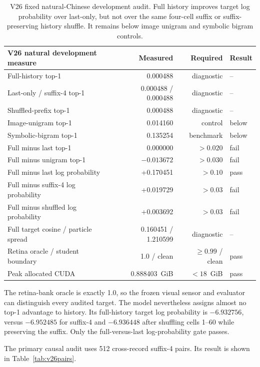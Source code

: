 \documentclass[11pt]{article}
\begin{document}
\begin{table}[t]
\centering
\small
\begin{tabular}{lrrl}
\toprule
V26 natural development measure & Measured & Required & Result \\
\midrule
Full-history top-1 & 0.000488 & diagnostic & -- \\
Last-only / suffix-4 top-1 & 0.000488 / 0.000488 & diagnostic & -- \\
Shuffled-prefix top-1 & 0.000488 & diagnostic & -- \\
Image-unigram top-1 & 0.014160 & control & below \\
Symbolic-bigram top-1 & 0.135254 & benchmark & below \\
Full minus last top-1 & 0.000000 & $>0.020$ & fail \\
Full minus unigram top-1 & $-0.013672$ & $>0.030$ & fail \\
Full minus last log probability & +0.170451 & $>0.10$ & pass \\
Full minus suffix-4 log probability & +0.019729 & $>0.03$ & fail \\
Full minus shuffled log probability & +0.003692 & $>0.03$ & fail \\
Full target cosine / particle spread & 0.160451 / 1.210599 & diagnostic & -- \\
Retina oracle / student boundary & 1.0 / clean & $\geq0.99$ / clean & pass \\
Peak allocated CUDA & 0.888403~GiB & $<18$~GiB & pass \\
\bottomrule
\end{tabular}
\caption{V26 fixed natural-Chinese development audit. Full history improves
target log probability over last-only, but not over the same four-cell suffix
or suffix-preserving history shuffle. It remains below image unigram and
symbolic bigram controls.}
\label{tab:v26natural}
\end{table}

The retina-bank oracle is exactly 1.0, so the frozen visual sensor and
evaluator can distinguish every audited target. The model nevertheless assigns
almost no top-1 advantage to history. Its full-history target log probability
is $-6.932756$, versus $-6.952485$ for suffix-4 and $-6.936448$ after shuffling
cells 1--60 while preserving the suffix. Only the full-versus-last
log-probability gate passes.

The primary causal audit uses 512 cross-record suffix-4 pairs. Its result is
shown in Table~\ref{tab:v26pairs}.
\end{document}
